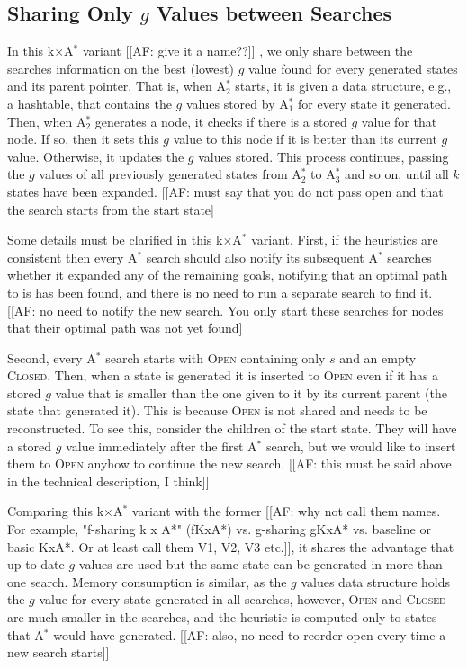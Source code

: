 \documentclass[twoside,11pt]{article}
\newcommand{\astar}{A$^*$\xspace}
\newcommand{\kxastar}{k$\times$A$^*$\xspace}
\newcommand{\astari}[1]{A$^*_#1$\xspace}
\newcommand{\open}{\textsc{Open}\xspace}
\newcommand{\closed}{\textsc{Closed}\xspace}
\begin{document}
\subsection{Sharing Only $g$ Values between Searches}
In this \kxastar variant [[AF: give it a name??]] , we only share between the searches information on the best (lowest) $g$ value found for every generated states and its parent pointer.
That is, when \astari{2} starts, it is given a data structure, e.g., a hashtable, that contains the $g$ values stored by \astari{1} for every state it generated.
Then, when \astari{2} generates a node, it checks if there is a stored $g$ value for that node.
If so, then it sets this $g$ value to this node if it is better than its current $g$ value.
Otherwise, it updates the $g$ values stored.
This process continues, passing the $g$ values of all previously generated states from \astari{2} to \astari{3} and so on, until all $k$ states have been expanded.  [[AF: must say that you do not pass open and that the search starts from the start state]

Some details must be clarified in this \kxastar variant.
First, if the heuristics are consistent then every \astar search should also notify its subsequent \astar searches whether it expanded any of the remaining goals, notifying that an optimal path to is has been found, and there is no need to run a separate search to find it. [[AF: no need to notify the new search. You only start these searches for nodes that their optimal path was not yet found]

Second, every \astar search starts with \open containing only $s$ and an empty \closed.
Then, when a state is generated it is inserted to \open even if it has a stored $g$ value that is smaller than the one given to it by its current parent (the state that generated it).
This is because \open is not shared and needs to be reconstructed.
To see this, consider the children of the start state.
They will have a stored $g$ value immediately after the first \astar search, but we would like to insert them to \open anyhow to continue the new search.  [[AF: this must be said above in the technical description, I think]]

Comparing this \kxastar variant with the former [[AF: why not call them names. For example, "f-sharing k x A*" (fKxA*) vs. g-sharing gKxA* vs. baseline or basic KxA*. Or at least call them V1, V2, V3 etc.]], it shares the advantage that up-to-date $g$ values are used but the same state can be generated in more than one search.
Memory consumption is similar, as the $g$ values data structure holds the $g$ value for every state generated in all searches, however, \open and \closed are much smaller in the searches, and the heuristic is computed only to states that \astar would have generated. [[AF: also, no need to reorder open every time a new search starts]]
\end{document}

